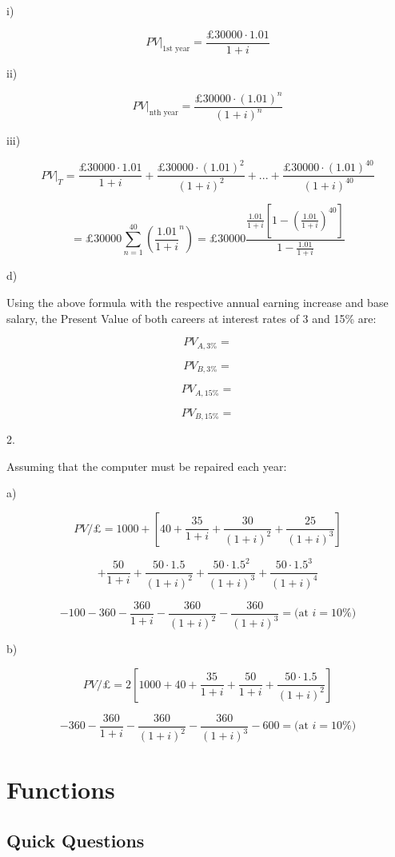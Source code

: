 \documentclass{article}
\begin{document}
\quad\quad i)

$$
  PV \big |_{\text{1st year}} = \frac{\text{£}30000\cdot 1.01}{1+i}
$$

\quad\quad ii)

$$
  PV \big |_{\text{nth year}} = \frac{\text{£}30000\cdot(1.01)^n}{(1+i)^n}
$$

\quad\quad iii)

$$
  PV \big |_T = \frac{\text{£}30000\cdot 1.01}{1+i} + \frac{\text{£}30000\cdot(1.01)^2}{(1+i)^2} + ... + \frac{\text{£}30000\cdot(1.01)^{40}}{(1+i)^{40}}
$$

$$
  = \text{£}30000\sum_{n=1}^{40} \left( \frac{1.01}{1+i}^n \right) = \text{£}30000 \frac{\frac{1.01}{1+i}\left[ 1-\left( \frac{1.01}{1+i} \right)^{40} \right]}{1-\frac{1.01}{1+i}}
$$

d)

Using the above formula with the respective annual earning increase and base salary, the Present Value of both careers at interest rates of 3 and 15\% are:

$$
  PV_{A, 3\%} =
$$

$$
  PV_{B, 3\%} =
$$

$$
  PV_{A, 15\%} =
$$

$$
  PV_{B, 15\%} =
$$

2.

Assuming that the computer must be repaired each year:

a)

$$
  PV/\text{£} = 1000 + \left[ 40 + \frac{35}{1+i} + \frac{30}{(1+i)^2} + \frac{25}{(1+i)^3} \right]
$$

$$
   + \frac{50}{1+i} + \frac{50\cdot1.5}{(1+i)^2} + \frac{50\cdot1.5^2}{(1+i)^3} + \frac{50\cdot1.5^3}{(1+i)^4}
$$

$$
   - 100 - 360 - \frac{360}{1+i} - \frac{360}{(1+i)^2} - \frac{360}{(1+i)^3} = \text{(at $i=10\%$)}
$$

b)

$$
  PV/\text{£} = 2\left[1000 + 40 + \frac{35}{1+i}  + \frac{50}{1+i} + \frac{50\cdot1.5}{(1+i)^2} \right]
$$

$$
  - 360 - \frac{360}{1+i} - \frac{360}{(1+i)^2} - \frac{360}{(1+i)^3} - 600 = \text{(at $i=10\%$)}
$$

\clearpage

\section{Functions}

\subsection{Quick Questions}
\noindent
\end{document}
